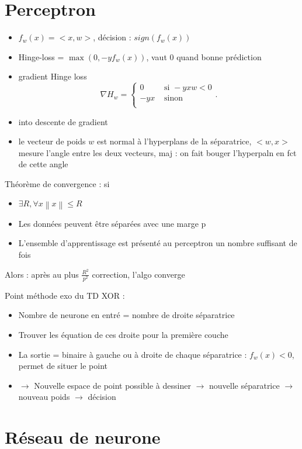 \documentclass{article}
\begin{document}
\section{Perceptron}
\begin{itemize}
    \item $ f_w(x) = <x, w> $, décision : $ sign(f_w(x)) $  
    \item Hinge-loss = $ \max (0, -y f_w(x)) $, vaut 0 quand bonne prédiction
    \item gradient Hinge loss 
    \[
        \nabla H_w = \begin{cases}
        0 &\text{ si } -y x w < 0\\
        -yx &\text{ sinon}\\
        \end{cases} 
    .\]
    \item into descente de gradient
    \item le vecteur de poids $ w $ est normal à l'hyperplans de la séparatrice, $ <w, x> $ mesure l'angle entre les deux vecteurs, maj : on fait bouger l'hyperpaln en fct de cette angle 
\end{itemize}
Théorème de convergence : si
\begin{itemize}
    \item $ \exists R, \forall x \left\| x \right\| \leq R $ 
    \item Les données peuvent être séparées avec une marge p
    \item L'ensemble d'apprentissage est présenté au perceptron un nombre suffisant
    de fois
\end{itemize}
Alors : après au plus $ \frac{R^2}{p^2} $ correction, l'algo converge

Point méthode exo du TD XOR : 
\begin{itemize}
    \item Nombre de neurone en entré = nombre de droite séparatrice
    \item Trouver les équation de ces droite pour la première couche
    \item La sortie = binaire à gauche ou à droite de chaque séparatrice : $ f_w(x) < 0 $, permet de situer le point 
    \item $\rightarrow$ Nouvelle espace de point possible à dessiner $\rightarrow$ nouvelle séparatrice $\rightarrow$ nouveau poids $\rightarrow$ décision
\end{itemize}
\section{Réseau de neurone}
\end{document}
